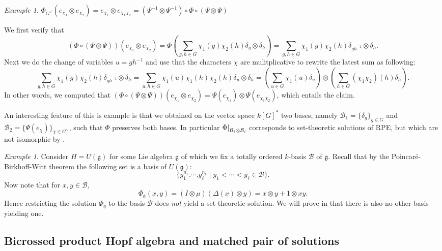 \documentclass[a4paper,10pt]{amsart}
\theoremstyle{definition}
\theoremstyle{remark}
\newtheorem{example}[lemma]{Example}
\newcommand\D{\Delta}
\newcommand\ot{\otimes}
\newcommand\mc{\mathcal}
\newcommand\restr[2]{{%
   \left.\kern-\nulldelimiterspace %
   #1 %
   \right|_{#2} %
   }}
\begin{document}
\begin{example}
 $\Phi_{G^{\vee}}(e_{\chi_1} \ot e_{\chi_2}) = e_{\chi_1}\ot e_{\chi_1\chi_2}= (\Psi^{-1}\ot \Psi^{-1}) \circ \Phi \circ (\Psi \ot \Psi)$\medskip

We first verify that
$$\left( \Phi \circ (\Psi \ot \Psi) \right) (e_{\chi_1} \ot e_{\chi_2}) = \Phi(\sum_{g,h\in G} \chi_1(g) \chi_2(h) \delta_g \ot \delta_h ) = \sum_{g,h\in G} \chi_1(g) \chi_2(h) \delta_{gh^{-1}} \ot \delta_h.$$
Next we do the change of variables $u= gh^{-1}$ and use that the characters $\chi$ are mulitplicative to rewrite the latest sum as following:
$$\sum_{g,h\in G} \chi_1(g) \chi_2(h) \delta_{gh^{-1}} \ot \delta_h = \sum_{u,h\in G} \chi_1(u)\chi_1(h) \chi_2(h) \delta_{u} \ot \delta_h= \left( \sum_{u\in G} \chi_1(u)\delta_u \right) \ot \left( \sum_{h\in G} (\chi_1\chi_2)(h)\delta_h \right).$$
In other words, we computed that $\left( \Phi \circ (\Psi \ot \Psi) \right) (e_{\chi_1} \ot e_{\chi_2}) = \Psi(e_{\chi_1})\ot \Psi(e_{\chi_1\chi_2})$, which entails the claim.\medskip

An interesting feature of this is example is that we obtained on the vector space $k[G]^*$ two bases, namely $\mc{B}_1 = \{ \delta_g \}_{g\in G}$ and $\mc{B}_2= \{ \Psi(e_{\chi})\}_{\chi \in G^{\vee}}$, such that $\Phi$ preserves both bases. In particular $\restr{\Phi}{\mc{B}_i\ot \mc{B}_i}$ corresponds to set-theoretic solutions of RPE, but which are not isomorphic by .
\end{example}

\begin{example}\label{sol from lie algebra}
 Consider $H = U(\mathfrak{g})$ for some Lie algebra $\mathfrak{g}$ of which we fix a totally ordered $k$-basis $\mathcal{B}$ of $\mathfrak{g}$. Recall that by the Poincar\'e-Birkhoff-Witt theorem the following set is a basis of $U(\mathfrak{g})$:  $$\{ y_1^{n_1}. \cdots . y_{\ell}^{n_{\ell}} \mid y_1 < \cdots < y_{\ell} \in \mathcal{B} \}.$$
Now note that for $x,y \in \mathcal{B}$,
$$\Phi_{\mathfrak{g}} (x,y) =(I \otimes \mu)(\D(x) \otimes y)= x\otimes y + 1 \otimes xy.$$
Hence restricting the solution $\Phi_{\mathfrak{g}}$ to the basis $\mathcal{B}$ does {\it not} yield a set-theoretic solution. We will prove in  that there is also no other basis yielding one.
\end{example}

\subsection{Bicrossed product Hopf algebra and matched pair of solutions}\label{section bicrossed}
\end{document}
